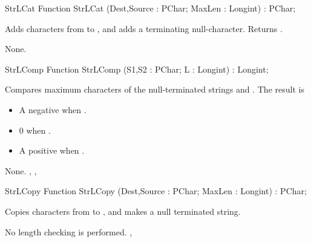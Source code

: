 \begin{function}{StrLCat}
\Declaration
Function StrLCat (Dest,Source : PChar; MaxLen : Longint) : PChar;

\Description

Adds  characters from  to , and adds a
terminating null-character. Returns .

\Errors
None.
\SeeAlso
{}
\end{function}
\html{}
\begin{function}{StrLComp}
\Declaration
Function StrLComp (S1,S2 : PChar; L : Longint) : Longint;

\Description

Compares maximum  characters of the null-terminated strings 
 and . 
The result is 
\begin{itemize}
\item A negative  when .
\item 0 when .
\item A positive  when .
\end{itemize}

\Errors
None.
\SeeAlso
{}, , 
\end{function}
\html{}
\begin{function}{StrLCopy}
\Declaration
Function StrLCopy (Dest,Source : PChar; MaxLen : Longint) : PChar;

\Description

Copies  characters from  to , and makes
 a null terminated string. 

\Errors
No length checking is performed.
\SeeAlso
{}, 
\end{function}
 
